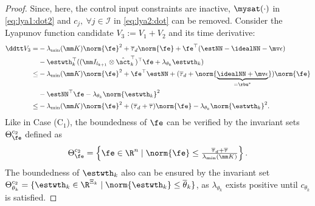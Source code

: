\documentclass[final,5p,times,twocolumn,authoryear]{elsarticle}
\begin{document}
\begin{proof}
Since, here, the control input constraints are inactive, $\mysat(\cdot)$ in \eqref{eq:lya1:dot2} and $c_j,\ \forall j\in\mathcal{I}$ in \eqref{eq:lya2:dot} can be removed.
Consider the Lyapunov function candidate $V_3:=V_1+V_2$ and its time derivative:
\begin{equation}
    \begin{aligned}
        \ddtt V_3
        =&
        -\lambda_{\min}(\mm K)\norm{\fe}^2
        +\overline\tau_d\norm{\fe}
        +\fe^\top (\estNN - \idealNN - \mv\epsilon)
        \\
        &
        -\estwth_k^\top (
            (\mm I_{l_{k+1}}\otimes \hat\act_k^\top)^\top
            \fe
            +
            \lambda_{\theta_k}\estwth_k
        )
        \\
        \le&
        -\lambda_{\min}(\mm K)\norm{\fe}^2
        +\fe^\top \estNN
        +(
            \overline\tau_d+\norm{
                \underbrace{
                    \idealNN+\mv\epsilon
                }_{=\rbu^*}
            }
        )
        \norm{\fe}
        \\
        &
        -\estNN^\top\fe 
        -\lambda_{\theta_k}\norm{\estwth_k}^2
        \\
        \le&
        -\lambda_{\min}(\mm K)\norm{\fe}^2
        +(\overline\tau_d+\overline\tau)
        \norm{\fe}
        -\lambda_{\theta_k}\norm{\estwth_k}^2
        .
    \end{aligned}
    \label{eq:lya3:dot}
\end{equation}
Like in Case (C$_1$), the boundedness of $\fe$ can be verified by the invariant sets $\Theta_{\fe}^{c_2}$ defined as
\begin{equation}
    \Theta_{\fe}^{c_2}
    =
    \left\{ 
        \fe \in \R^n 
        \mid 
        \norm{\fe} 
        \le 
        \tfrac{
            \overline\tau_d+\overline\tau
        }{
            \lambda_{\min}(\mm K)
        }
    \right\}
    .
\end{equation}
The boundedness of $\estwth_k$ also can be ensured by the invariant set $\Theta_{\theta_k}^{c_2}=\{ \estwth_k \in \R^{\Xi_{k}} \mid \norm{\estwth_k} \le \overline\theta_k \}$, as $\lambda_{\theta_k}$ exists positive until $c_{\theta_k}$ is satisfied.

\hfill 


\end{proof}
\end{document}
